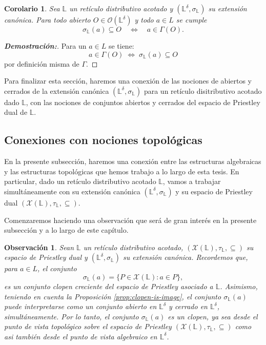 \documentclass[12pt]{book}
\newtheorem{corollary}[theorem]{Corolario}
\newtheorem{remark}[theorem]{Observación}
\begin{document}
\begin{corollary}\label{cor:caracterizacion-U-Gamma}
Sea $\mathbb{L}$ un retículo distributivo acotado y 
$(\mathbb{L}^{\delta},\sigma_{\mathbb{L}})$ su extensión canónica.
Para todo abierto $O\in\mathcal{O}(\mathbb{L}^\delta)$ y todo $a\in L$ se cumple
\[
\sigma_{\mathbb{L}}(a)\subseteq O
\quad\Longleftrightarrow\quad
a\in\Gamma(O).
\]
\end{corollary}


\begin{proof}[\textbf{Demostración:}]
Para un $a\in L$ se tiene:
\[
a\in\Gamma(O)
\;\Longleftrightarrow\;
\sigma_{\mathbb L}(a)\subseteq O
\]
por definición misma de $\Gamma$.
\end{proof}
Para finalizar esta sección, haremos una conexión de las nociones de abiertos y cerrados de la extensión canónica $(\mathbb{L}^{\delta},\sigma_{\mathbb{L}})$ para un retículo disitributivo acotado dado $\mathbb{L}$, con las nociones de conjuntos abiertos y cerrados del espacio de Priestley dual de $\mathbb{L}$.

\subsection{Conexiones con nociones topológicas}

En la presente subsección, haremos una conexión entre las estructuras algebraicas y las estructuras topológicas que hemos trabajo a lo largo de esta tesis. En particular, dado un retículo distributivo acotado $\mathbb{L}$, vamos a trabajar simultáneamente con su extensión canónica $(\mathbb{L}^{\delta},\sigma_{\mathbb{L}})$ y su espacio de Priestley dual $(\mathcal{X}(\mathbb{L}),\tau_{\mathbb{L}},\subseteq)$.

\vspace{0.2cm}

Comenzaremos haciendo una observación que será de gran interés en la presente subsección y a lo largo de este capítulo.

\begin{remark} Sean $\mathbb{L}$ un retículo distributivo acotado, $(\mathcal{X}(\mathbb{L}),\tau_{\mathbb{L}},\subseteq)$ su espacio de Priestley dual y $\left(\mathbb{L}^{\delta},\sigma_{\mathbb{L}}\right)$ su extensión canónica. Recordemos que, para $a \in L$, el conjunto 
\[ \sigma_{\mathbb{L}}(a) = \{ P \in \mathcal{X}(\mathbb{L}) \colon a \in P \},\]
es un conjunto clopen creciente del espacio de Priestley asociado a $\mathbb{L}$. Asimismo, teniendo en cuenta la Proposición \ref{prop:clopen-is-image}, el conjunto $\sigma_{\mathbb{L}}(a)$ puede interpretarse como un conjunto abierto en $\mathbb{L}^{\delta}$ y cerrado en $\mathbb{L}^{\delta}$, simultáneamente. Por lo tanto, el conjunto $\sigma_{\mathbb{L}}(a)$ es un clopen, ya sea desde el punto de vista topológico sobre el espacio de Priestley $(\mathcal{X}(\mathbb{L}),\tau_{\mathbb{L}},\subseteq)$ como asi también desde el punto de vista algebraico en $\mathbb{L}^{\delta}$.   
\end{remark}
\end{document}
